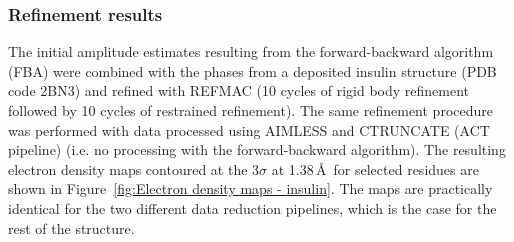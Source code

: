 \subsubsection{Refinement results}
\label{subs:Refinement results - insulin}
The initial amplitude estimates resulting from the forward-backward algorithm (FBA) were combined with the phases from a deposited insulin structure (PDB code 2BN3) and refined with REFMAC \cite{murshudov2011refmac5} (10 cycles of rigid body refinement followed by 10 cycles of restrained refinement).
The same refinement procedure was performed with data processed using AIMLESS \cite{evans2013} and CTRUNCATE (ACT pipeline)\cite{winn2011} (i.e. no processing with the forward-backward algorithm).
The resulting electron density maps contoured at the 3$\sigma$ at 1.38$\,$\AA\ for selected residues are shown in Figure~\ref{fig:Electron density maps - insulin}.
The maps are practically identical for the two different data reduction pipelines, which is the case for the rest of the structure.

